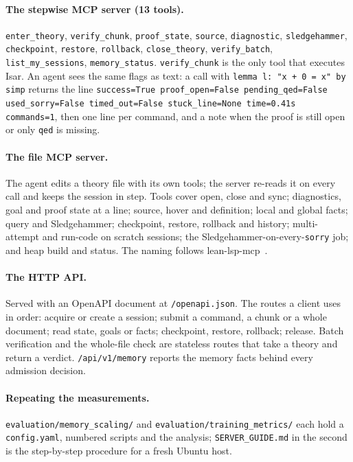 \documentclass[11pt]{article}
\newcommand{\code}[1]{\colorbox{gray!12}{\texttt{\vphantom{Ag}#1}}}
\begin{document}
\paragraph{The stepwise MCP server (13 tools).} \code{enter\_theory},
\code{verify\_chunk}, \code{proof\_state}, \code{source},
\code{diagnostic}, \code{sledgehammer}, \code{checkpoint}, \code{restore},
\code{rollback}, \code{close\_theory}, \code{verify\_batch},
\code{list\_my\_sessions}, \code{memory\_status}.
\code{verify\_chunk} is the only tool that executes Isar. An agent sees
the same flags as text: a call with \texttt{lemma l: "x + 0 = x" by
simp} returns the line \texttt{success=True proof\_open=False
pending\_qed=False used\_sorry=False timed\_out=False stuck\_line=None
time=0.41s commands=1}, then one line per command, and a note when the
proof is still open or only \code{qed} is missing.

\paragraph{The file MCP server.} The agent edits a theory file
with its own tools; the server re-reads it on every call and keeps the
session in step. Tools cover open, close and sync; diagnostics, goal and
proof state at a line; source, hover and definition; local and global
facts; query and Sledgehammer; checkpoint, restore, rollback and history;
multi-attempt and run-code on scratch sessions; the Sledgehammer-on-every-\code{sorry}
job; and heap build and status. The naming follows
lean-lsp-mcp~\cite{dressler2026leanlspmcp}.

\paragraph{The HTTP API.} Served with an OpenAPI document at
\code{/openapi.json}. The routes a client uses in order: acquire or
create a session; submit a command, a chunk or a whole document; read
state, goals or facts; checkpoint, restore, rollback; release. Batch
verification and the whole-file check are stateless routes that take a
theory and return a verdict. \code{/api/v1/memory} reports the memory
facts behind every admission decision.

\paragraph{Repeating the measurements.}
\code{evaluation/memory\_scaling/} and
\code{evaluation/training\_metrics/} each hold a \code{config.yaml},
numbered scripts and the analysis; \code{SERVER\_GUIDE.md} in the second
is the step-by-step procedure for a fresh Ubuntu host.
\end{document}
